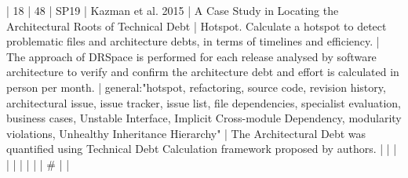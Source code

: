 | 18 |         48 | SP19 | Kazman et al. 2015                                                   | A Case Study in Locating the Architectural Roots of Technical Debt                                                                                                       | Hotspot. Calculate a hotspot to detect problematic files and architecture debts, in terms of timelines and efficiency.                                                                                                                                   | The approach of DRSpace is performed for each release analysed by software architecture to verify and confirm the architecture debt and effort is calculated in person per month.                                                                                  | general:"hotspot, refactoring, source code, revision history, architectural issue, issue tracker, issue list, file dependencies, specialist evaluation, business cases, Unstable Interface, Implicit Cross-module Dependency, modularity violations, Unhealthy Inheritance Hierarchy"                    | The Architectural Debt was quantified using Technical Debt Calculation framework proposed by authors.                                                                                                                                                                                                                                                                                                                                                                                        |
|    |            |      |                                                                      |                                                                                                                                                                          |                                                                                                                                                                                                                                                            |                                                                                                                                                                                                                                                                      |  #                                                                                                                                                                                                                                                                                                       |                                                                                                                                                                                                                                                                                                                                                                                                                                                                                              |
